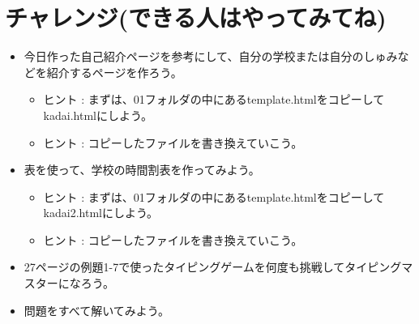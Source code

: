 \documentclass[a4paper,12pt]{jarticle}
\begin{document}
\section{チャレンジ(できる人はやってみてね)}
\begin{itemize}
      \item
            今日作った自己紹介ページを参考にして、自分の学校または自分のしゅみなどを紹介するページを作ろう。

            \begin{itemize}
                  \item ヒント :
                        まずは、01フォルダの中にあるtemplate.htmlをコピーしてkadai.htmlにしよう。
                  \item ヒント :
                        コピーしたファイルを書き換えていこう。
            \end{itemize}
      \item
            表を使って、学校の時間割表を作ってみよう。

            \begin{itemize}
                  \item ヒント :
                        まずは、01フォルダの中にあるtemplate.htmlをコピーしてkadai2.htmlにしよう。
                  \item ヒント :
                        コピーしたファイルを書き換えていこう。
            \end{itemize}
      \item
            27ページの例題1-7で使ったタイピングゲームを何度も挑戦してタイピングマスターになろう。
      \item 問題をすべて解いてみよう。
\end{itemize}

\bigskip


\bigskip


\bigskip

\clearpage
\end{document}
